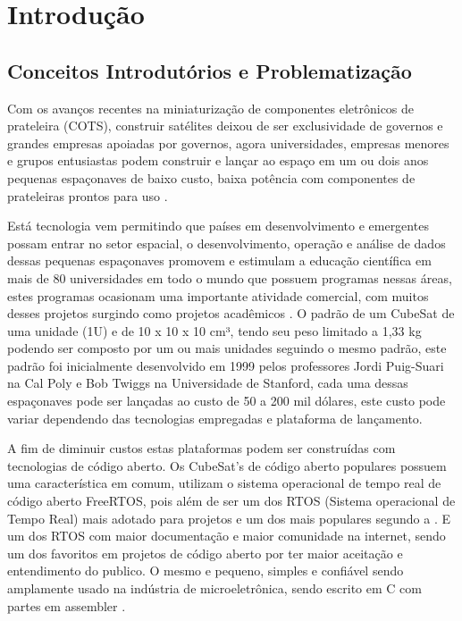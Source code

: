 
\chapter{Introdução}\label{intro}
\section{Conceitos Introdutórios e Problematização}
Com os avanços recentes na miniaturização de componentes eletrônicos de prateleira (COTS), construir 
satélites deixou de ser exclusividade de governos e grandes empresas apoiadas por governos, agora 
universidades, empresas menores e grupos entusiastas podem construir e lançar ao espaço em um ou dois 
anos pequenas espaçonaves de baixo custo, baixa potência com componentes de prateleiras prontos para 
uso \cite{Poghosyan2017}.

Está tecnologia vem permitindo que países em desenvolvimento e emergentes possam entrar no setor espacial, 
o desenvolvimento, operação e análise de dados dessas pequenas espaçonaves promovem e estimulam a educação 
científica em mais de 80 universidades em todo o mundo que possuem programas nessas áreas, estes programas 
ocasionam uma importante atividade comercial, com muitos desses projetos surgindo como projetos acadêmicos 
\cite{Woellert2011}. O padrão de um CubeSat de uma unidade (1U) e de 10 x 10 x 10 cm³, tendo seu peso 
limitado a 1,33 kg podendo ser composto por um ou mais unidades seguindo o mesmo padrão, este padrão foi 
inicialmente desenvolvido em 1999 pelos professores Jordi Puig-Suari na Cal Poly e Bob Twiggs na Universidade 
de Stanford, cada uma dessas espaçonaves pode ser lançadas ao custo de 50 a 200 mil dólares\cite{Selva2012}, 
este custo pode variar dependendo das tecnologias empregadas e plataforma de lançamento.


A fim de diminuir custos estas plataformas podem ser construídas com tecnologias de código aberto. Os CubeSat's 
de código aberto populares possuem uma característica em comum, utilizam o sistema operacional de tempo real de 
código aberto FreeRTOS, pois além de ser um dos RTOS (Sistema operacional de Tempo Real) mais adotado para projetos e um dos mais populares segundo 
a \cite{Lynx}. E um dos RTOS com maior documentação e maior comunidade na internet, sendo um dos favoritos em 
projetos de código aberto por ter maior aceitação e entendimento do publico. O mesmo e pequeno, simples e confiável 
sendo amplamente usado na indústria de microeletrônica, sendo escrito em C com partes em assembler \cite{nicolas2019avaliaccao}.


